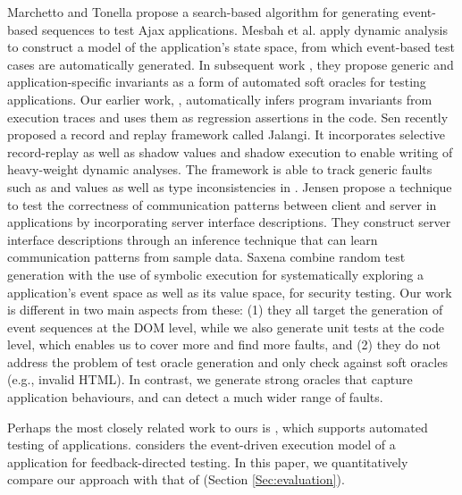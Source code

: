 Marchetto and Tonella \cite{marchetto:search} propose a search-based algorithm for generating event-based sequences to test Ajax applications. 
Mesbah et al.  \cite{mesbah:tweb11} apply dynamic analysis to construct a model of the application's state space, from which event-based test cases are automatically generated. In subsequent work \cite{mesbah:tse12}, they propose generic and application-specific invariants as a form of automated soft oracles for testing \ajax applications.  Our earlier work, \jsart \cite{mirshokraie:icwe12},  automatically infers program invariants from \javascript execution traces and uses them as regression assertions in the code. 
Sen \etal \cite{sen:fse13} recently proposed a record and replay framework called Jalangi. It incorporates selective record-replay as well as shadow values and shadow execution to enable writing of heavy-weight dynamic analyses.
The framework is able to track generic faults such as  and  values as well as type inconsistencies in \javascript. 
Jensen \etal \cite{jensen:fse13} propose a technique to test the correctness of communication patterns between client and server in \ajax applications by incorporating server interface descriptions.
They construct server interface descriptions through an inference technique that can learn communication patterns from sample data.
Saxena \etal \cite{song:symb10} combine random test generation with the use of symbolic execution for systematically exploring a \javascript application's event space as well as its value space, for security testing.
Our work is different in two main aspects from these: (1) they all target the generation of event sequences at the DOM level, while we also generate unit tests at the \javascript code level, which enables us to cover more and find more faults,
and (2) they do not address the problem of test oracle generation and only check against soft oracles (e.g., invalid HTML). In contrast, we generate strong oracles that capture
application behaviours, and can detect a much wider range of faults.

Perhaps the most closely related work to ours is \artemis \cite{artzi:icse11}, which supports automated testing of \javascript applications.
\artemis considers the event-driven execution model of a \javascript application for feedback-directed testing.
In this paper, we quantitatively compare our approach with that of \artemis (Section \ref{Sec:evaluation}).

